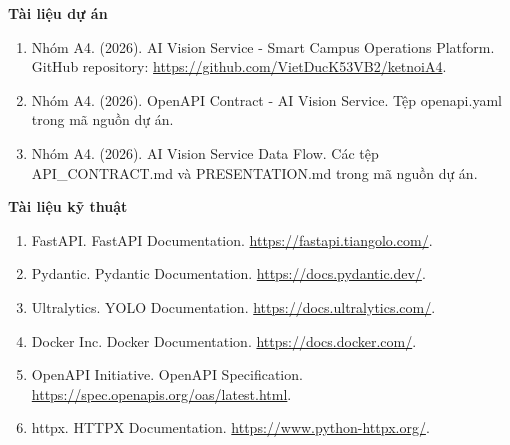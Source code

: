 
\textbf{Tài liệu dự án}

\begin{enumerate}
    \item Nhóm A4. (2026). AI Vision Service - Smart Campus Operations Platform. GitHub repository: \url{https://github.com/VietDucK53VB2/ketnoiA4}.
    \item Nhóm A4. (2026). OpenAPI Contract - AI Vision Service. Tệp openapi.yaml trong mã nguồn dự án.
    \item Nhóm A4. (2026). AI Vision Service Data Flow. Các tệp API\_CONTRACT.md và PRESENTATION.md trong mã nguồn dự án.
\end{enumerate}

\textbf{Tài liệu kỹ thuật}

\begin{enumerate}
    \item FastAPI. FastAPI Documentation. \url{https://fastapi.tiangolo.com/}.
    \item Pydantic. Pydantic Documentation. \url{https://docs.pydantic.dev/}.
    \item Ultralytics. YOLO Documentation. \url{https://docs.ultralytics.com/}.
    \item Docker Inc. Docker Documentation. \url{https://docs.docker.com/}.
    \item OpenAPI Initiative. OpenAPI Specification. \url{https://spec.openapis.org/oas/latest.html}.
    \item httpx. HTTPX Documentation. \url{https://www.python-httpx.org/}.
\end{enumerate}

